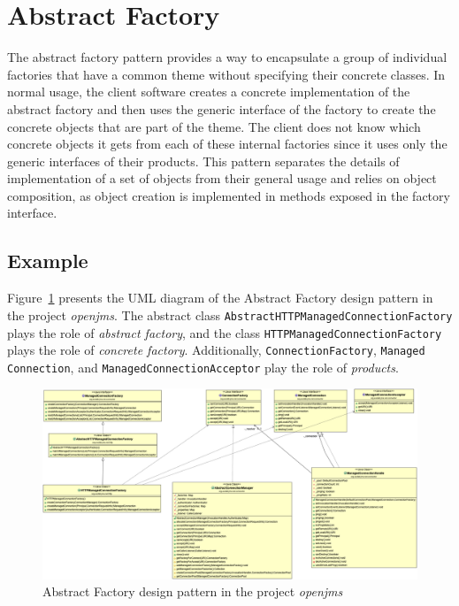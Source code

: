 \section{Abstract Factory}

The abstract factory pattern provides a way to encapsulate a group of individual factories that have a common theme without specifying their concrete classes. In normal usage, the client software creates a concrete implementation of the abstract factory and then uses the generic interface of the factory to create the concrete objects that are part of the theme. The client does not know which concrete objects it gets from each of these internal factories since it uses only the generic interfaces of their products. This pattern separates the details of implementation of a set of objects from their general usage and relies on object composition, as object creation is implemented in methods exposed in the factory interface.

\subsection*{Example}

Figure~\ref{fig:abstract_factory} presents the UML diagram of the Abstract Factory design pattern in the project \textit{openjms}. The abstract class \texttt{AbstractHTTPManagedConnectionFactory} plays the role of \textit{abstract factory}, and the class \texttt{HTTPManagedConnectionFactory} plays the role of \textit{concrete factory}. Additionally, \texttt{ConnectionFactory}, \texttt{Managed\\Connection}, and \texttt{ManagedConnectionAcceptor} play the role of \textit{products}.\\

\begin{figure}[htb]
    \centering
    \includegraphics[width=\columnwidth]{images/abstract_factory.png}
    \caption{Abstract Factory design pattern in the project \textit{openjms}}
    \label{fig:abstract_factory}
\end{figure}
\FloatBarrier


